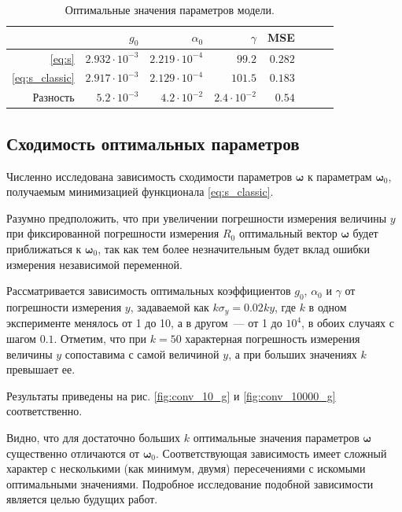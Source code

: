 \documentclass[11pt,a4paper]{article}
\begin{document}
\begin{table}[h]
  \caption{Оптимальные значения параметров модели.}
  \centering
  \begin{tabular}{| r | r | r | r | r | r | r | r |}
	\hline
							& $g_0$					& $\alpha_0$			& $\gamma$				& MSE		\\ \hline
	\eqref{eq:s}			& $2.932 \cdot 10^{-3}$	& $2.219 \cdot 10^{-4}$	& $99.2$				& $0.282$	\\ \hline
	\eqref{eq:s_classic}	& $2.917 \cdot 10^{-3}$	& $2.129 \cdot 10^{-4}$	& $101.5$				& $0.183$	\\ \hline
	Разность				& $5.2 \cdot 10^{-3}$	& $4.2 \cdot 10^{-2}$	& $2.4 \cdot 10^{-2}$	& $0.54$	\\ \hline
  \end{tabular}
  \label{tabl:res_coeffs}
\end{table}

\subsection{Сходимость оптимальных параметров}
Численно исследована зависимость сходимости параметров $\boldsymbol{\omega}$ к параметрам
$\boldsymbol{\omega}_0$, получаемым минимизацией функционала \eqref{eq:s_classic}.

Разумно предположить, что при увеличении погрешности измерения величины $y$ при
фиксированной погрешности измерения $R_0$ оптимальный вектор $\boldsymbol{\omega}$
будет приближаться к $\boldsymbol{\omega}_0$, так как тем более незначительным
будет вклад ошибки измерения независимой переменной.

Рассматривается зависимость оптимальных коэффициентов $g_0$, $\alpha_0$ и $\gamma$ от
погрешности измерения $y$, задаваемой как $k \sigma_y = 0.02ky$, где $k$ в одном эксперименте
менялось от 1 до 10, а в другом~--- от 1 до $10^4$, в обоих случаях с шагом $0.1$.
Отметим, что при $k = 50$ характерная погрешность измерения величины $y$ сопоставима с самой
величиной $y$, а при больших значениях $k$ превышает ее.

Результаты приведены на рис. \ref{fig:conv_10_g} и \ref{fig:conv_10000_g} соответственно.

Видно, что для достаточно больших $k$ оптимальные значения параметров $\boldsymbol{\omega}$
существенно отличаются от $\boldsymbol{\omega}_0$. Соответствующая зависимость имеет сложный
характер с несколькими (как минимум, двумя) пересечениями с искомыми оптимальными значениями.
Подробное исследование подобной зависимости является целью будущих работ.
\end{document}
